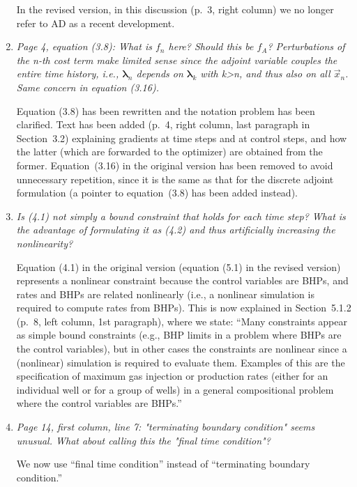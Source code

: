 \documentclass{article}
\def\blambda{{\pmb{\lambda}}}%
\def\x{{\vec x}}
\begin{document}
\begin{enumerate}
In the revised version, in this discussion (p.~3, right column) we no longer refer to AD as a recent development.

   \item {\it Page 4, equation (3.8): What is $f_n$ here? Should this be $f_A$?
   Perturbations of the n-th cost term make limited sense since the
   adjoint variable couples the entire time history, i.e., $\blambda_n$
   depends on $\blambda_k$ with k>n, and thus also on all $\x_n$.  Same concern
   in equation (3.16).}

  Equation (3.8) has been rewritten and the notation problem has been clarified.
  Text has been added (p.~4, right column, last paragraph in Section~3.2) explaining gradients at time steps and at control steps, and how the latter (which are forwarded to the optimizer) 
  are obtained from the former.
  Equation~(3.16) in the original version has been removed to avoid 
  unnecessary repetition, since it is the same as that for the discrete 
  adjoint formulation (a pointer to equation~(3.8)
  has been added instead).

 

   \item {\it Is (4.1) not simply a bound constraint that holds for each time
   step? What is the advantage of formulating it as (4.2) and thus
   artificially increasing the nonlinearity?}

Equation (4.1) in the original version (equation (5.1) in the revised version) represents a nonlinear constraint because the control variables are BHPs, and rates and BHPs are related nonlinearly (i.e., a nonlinear simulation is required to compute rates from BHPs). This is now explained in Section~5.1.2 (p.~8, left column, 1st paragraph), where we state: ``Many constraints appear as simple bound constraints (e.g., BHP limits in a problem where BHPs are the control variables), but in other cases the constraints are nonlinear since a (nonlinear) simulation is required to evaluate them. Examples of this are the specification of maximum 
gas injection or production rates (either for an individual well or for a group of wells) in a 
general compositional problem where the control variables are BHPs.''


   \item {\it Page 14, first column, line 7: "terminating boundary condition"
   seems unusual.  What about calling this the "final time condition"?}

We now use ``final time condition'' instead of ``terminating boundary condition.''


\end{enumerate}
\end{document}
